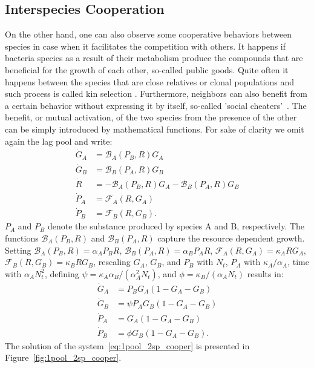 \documentclass[10pt,A4paper]{article}
\numberwithin{equation}{section}
\begin{document}
\subsection{Interspecies Cooperation}
On the other hand, one can also observe some cooperative behaviors between species in case when it facilitates the competition with others.
It happens if bacteria species as a result of their metabolism produce the compounds that are beneficial for the growth of each other, so-called public goods.
Quite often it happens between the species that are close relatives or clonal populations and such process is called kin selection \cite{west_social_2007}.
Furthermore, neighbors can also benefit from a certain behavior without expressing it by itself, so-called 'social cheaters'~\cite{rainey_evolution_2003}.
%
%
The benefit, or mutual activation, of the two species from the presence of the other can be simply introduced by mathematical functions.
For sake of clarity we omit again the lag pool and write:
\begin{align}
    \dot{G}_A &= \mathcal{B}_A(P_B,R)G_A\\
    \dot{G}_B &= \mathcal{B}_B(P_A,R)G_B\\
    \dot{R} &=-\mathcal{B}_A(P_B,R)G_A-\mathcal{B}_B(P_A,R)G_B\\
    \dot{P}_A &= \mathcal{F}_A(R,G_A)\\
    \dot{P}_B &= \mathcal{F}_B(R,G_B).
\end{align}
$P_A$ and $P_B$ denote the substance produced by species A and B, respectively.
The functions $\mathcal{B}_A(P_B,R)$ and $\mathcal{B}_B(P_A,R)$ capture the resource dependent growth.
Setting $\mathcal{B}_A(P_B,R)=\alpha_A P_BR$, $\mathcal{B}_B(P_A,R)=\alpha_B P_A R$, $\mathcal{F}_A(R,G_A)=\kappa_A RG_A$, $\mathcal{F}_B(R,G_B)=\kappa_B RG_B$, rescaling $G_A$, $G_B$, and $P_B$ with $N_t$, $P_A$ with $\kappa_A/\alpha_A$, time with $\alpha_AN_t^2$, defining $\psi=\kappa_A\alpha_B/(\alpha_A^2N_t)$, and $\phi=\kappa_B/(\alpha_A N_t)$ results in:
\begin{align}
    \dot{G}_A &= P_B G_A\left(1 - G_A-G_B\right)\\
    \dot{G}_B &= \psi P_A G_B\left(1 - G_A-G_B\right)\\
    \dot{P}_A &= G_A\left(1 - G_A-G_B\right)\\
    \dot{P}_B &=\phi G_B\left(1 - G_A-G_B\right).
    \label{eq:1pool_2sp_cooper}
\end{align}
%
The solution of the system~\ref{eq:1pool_2sp_cooper} is presented in Figure~\ref{fig:1pool_2sp_cooper}.
\end{document}
